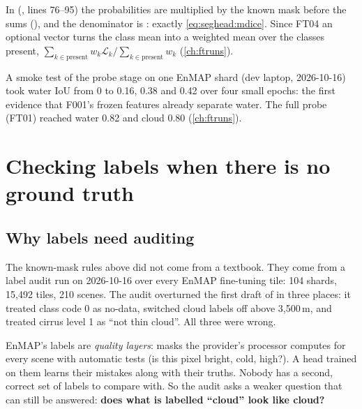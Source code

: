 
\begin{sourcenote}
In  (, lines 76--95) the probabilities are multiplied by the known mask before the sums
(), and the denominator is : exactly \eqref{eq:seghead:mdice}. Since FT04
an optional  vector turns the class mean into a weighted mean over the classes present,
$\sum_{k \in \text{present}} w_k\mathcal{L}_k / \sum_{k \in \text{present}} w_k$ (\cref{ch:ftruns}).
\end{sourcenote}

\begin{drift}
A smoke test of the probe stage on one EnMAP shard (dev laptop, 2026-10-16) took water IoU from 0 to 0.16, 0.38 and 0.42 over four small epochs:
the first evidence that F001's frozen features already separate water.\tbrk{} The full probe (FT01) reached water 0.82 and
cloud 0.80 (\cref{ch:ftruns}).
\end{drift}

\section{Checking labels when there is no ground truth}\label{sec:seghead:audit}

\subsection{Why labels need auditing}

The known-mask rules above did not come from a textbook. They come from a label audit run on 2026-10-16 over every EnMAP fine-tuning tile: 104
shards, 15,492 tiles, 210 scenes.\tbrk{} The audit overturned the first draft of
 in three places: it treated class code 0 as no-data, switched cloud labels off above 3,500\,m, and treated cirrus level 1 as
``not thin cloud''. All three were wrong.

EnMAP's labels are \emph{quality layers}: masks the provider's processor computes for every scene with automatic tests (is this pixel bright,
cold, high?). A head trained on them learns their mistakes along with their truths. Nobody has a second, correct set of labels to compare with.
So the audit asks a weaker question that can still be answered: \textbf{does what is labelled ``cloud'' look like cloud?}

